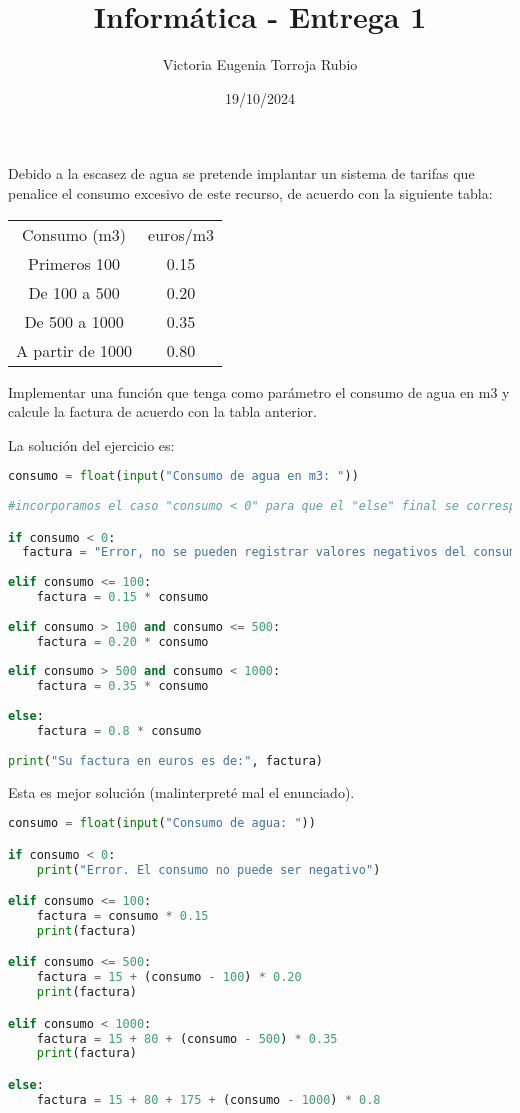 \documentclass{article}
\begin{document}
\title{Informática - Entrega 1}
\author{Victoria Eugenia Torroja Rubio}
\date{19/10/2024}

\maketitle

\begin{ej}
Debido a la escasez de agua se pretende implantar un sistema de tarifas que penalice el consumo excesivo de este recurso, de acuerdo con la siguiente tabla:
\begin{center}
\begin{tabular}{c c}
	Consumo (m3) & euros/m3 \\
	Primeros 100 & 0.15 \\
	De 100 a 500 & 0.20 \\
	De 500 a 1000 & 0.35 \\
	A partir de 1000 & 0.80
\end{tabular}
\end{center}
 Implementar una función que tenga como parámetro el consumo de agua en m3 y calcule la factura de acuerdo con la tabla anterior.
\end{ej}

\begin{sol} La solución del ejercicio es:
\begin{lstlisting}[language = Python]
consumo = float(input("Consumo de agua en m3: "))
    
#incorporamos el caso "consumo < 0" para que el "else" final se corresponda con el caso "consumo >= 1000"

if consumo < 0:
  factura = "Error, no se pueden registrar valores negativos del consumo"
  
elif consumo <= 100:
    factura = 0.15 * consumo
    
elif consumo > 100 and consumo <= 500:
    factura = 0.20 * consumo
    
elif consumo > 500 and consumo < 1000:
    factura = 0.35 * consumo
    
else:
    factura = 0.8 * consumo
    
print("Su factura en euros es de:", factura)
\end{lstlisting}
\end{sol}

Esta es mejor solución (malinterpreté mal el enunciado).
\begin{lstlisting}[language = Python]
consumo = float(input("Consumo de agua: "))

if consumo < 0:
	print("Error. El consumo no puede ser negativo")

elif consumo <= 100:
	factura = consumo * 0.15
	print(factura)

elif consumo <= 500:
	factura = 15 + (consumo - 100) * 0.20
	print(factura)

elif consumo < 1000:
	factura = 15 + 80 + (consumo - 500) * 0.35	
	print(factura)

else:
	factura = 15 + 80 + 175 + (consumo - 1000) * 0.8
\end{lstlisting}
\end{document}
